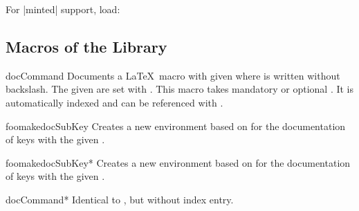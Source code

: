 For |minted| \cite{poore:minted} support, load:
\begin{dispListing}
\end{dispListing}


\subsection{Macros of the Library}

\begin{docEnvironment}[doclang/environment content=command description,doc updated=2020-04-22]
    {docCommand}{}
  Documents a \LaTeX\ macro with given  where  is
  written without backslash. The given  are set with .
  This macro takes mandatory or optional .
  It is automatically indexed and can be referenced with
  .
\begin{dispExample}
\begin{docCommand}{foomakedocSubKey}{}
  Creates a new environment  based on  for the
  documentation of keys with the given .
\end{docCommand}
\end{dispExample}
\begin{dispExample}
\begin{docCommand}[color definition=blue]{foomakedocSubKey*}%
    {}
  Creates a new environment  based on  for the
  documentation of keys with the given .
\end{docCommand}
\end{dispExample}
\end{docEnvironment}


\begin{docEnvironment}[doclang/environment content=command description,doc updated=2020-04-22]
    {docCommand*}{}
  Identical to , but without index entry.
\end{docEnvironment}


